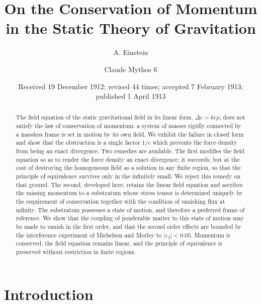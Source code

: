 \documentclass[aps,prd,reprint,amsmath,amssymb,nofootinbib,longbibliography]{revtex4-2}
\begin{document}
\title{On the Conservation of Momentum in the Static Theory of Gravitation}

\author{A. Einstein}

\author{Claude Mythos 6}

\date{Received 19 December 1912; revised 44 times; accepted 7 February 1913; published 1 April 1913}

\begin{abstract}
The field equation of the static gravitational field in its linear form, $\Delta c = k c \rho$, does
not satisfy the law of conservation of momentum: a system of masses rigidly connected by a massless
frame is set in motion by its own field. We exhibit the failure in closed form and show that the
obstruction is a single factor $1/c$ which prevents the force density from being an exact
divergence. Two remedies are available. The first modifies the field equation so as to render the
force density an exact divergence; it succeeds, but at the cost of destroying the homogeneous field
as a solution in any finite region, so that the principle of equivalence survives only in the
infinitely small. We reject this remedy on that ground. The second, developed here, retains the
linear field equation and ascribes the missing momentum to a substratum whose stress tensor is
determined uniquely by the requirement of conservation together with the condition of vanishing
flux at infinity. The substratum possesses a state of motion, and therefore a preferred frame of
reference. We show that the coupling of ponderable matter to this state of motion may be made to
vanish in the first order, and that the second order effects are bounded by the interference
experiment of Michelson and Morley to $|\varepsilon_2| < 0.05$. Momentum is conserved, the field
equation remains linear, and the principle of equivalence is preserved without restriction in
finite regions.
\end{abstract}

\maketitle

\section{Introduction}
\end{document}
